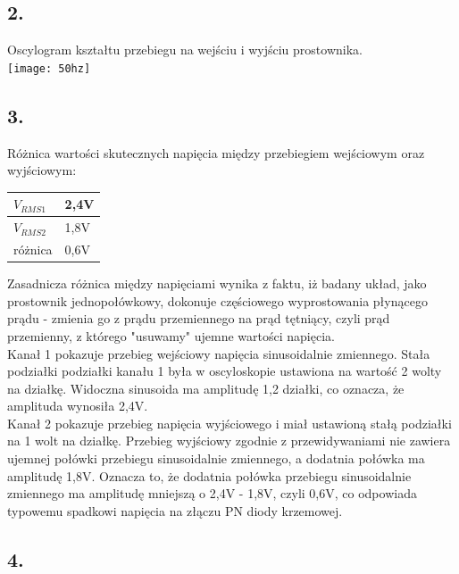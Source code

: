 \documentclass[polish,a4paper]{article}
\begin{document}
\newpage

\subsection*{2.} 

Oscylogram kształtu przebiegu na wejściu i wyjściu prostownika.\\

\texttt{[image: 50hz]}



\subsection*{3.} Różnica wartości skutecznych napięcia między przebiegiem wejściowym oraz wyjściowym:

\begin{center}
\begin{tabular}{|l|l|}
\hline
$V_{RMS1}$ & 2,4V \\
\hline
$V_{RMS2}$ & 1,8V \\ 
\hline
różnica & 0,6V \\
\hline
\end{tabular}
\end{center}

\begin{flushleft}
Zasadnicza różnica między napięciami wynika z faktu, iż badany układ, jako prostownik jednopołówkowy, dokonuje częściowego wyprostowania płynącego prądu - zmienia go z prądu przemiennego na prąd tętniący, czyli prąd przemienny, z którego "usuwamy" ujemne wartości napięcia.\\
Kanał 1 pokazuje przebieg wejściowy napięcia sinusoidalnie zmiennego. Stała podziałki podziałki kanału 1 była w oscyloskopie ustawiona na wartość 2 wolty na działkę. Widoczna sinusoida ma amplitudę 1,2 działki, co oznacza, że amplituda wynosiła 2,4V.\\
Kanał 2 pokazuje przebieg napięcia wyjściowego i miał ustawioną stałą podziałki na 1 wolt na działkę. Przebieg wyjściowy zgodnie z przewidywaniami nie zawiera ujemnej połówki przebiegu sinusoidalnie zmiennego, a dodatnia połówka ma amplitudę 1,8V. Oznacza to, że dodatnia połówka przebiegu sinusoidalnie zmiennego ma amplitudę mniejszą o 2,4V - 1,8V, czyli 0,6V, co odpowiada typowemu spadkowi napięcia na złączu PN diody krzemowej.
 
\end{flushleft}


\subsection*{4.}
\end{document}
